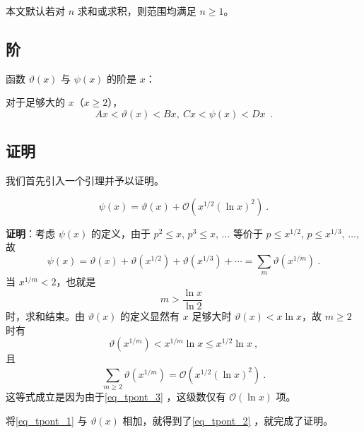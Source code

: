 
本文默认若对 $n$ 求和或求积，则范围均满足 $n \ge 1$。
\subsection{阶}
\begin{theorem}{}
函数 $\vartheta(x)$ 与 $\psi(x)$ 的阶是 $x$：

对于足够大的 $x$（$x \ge 2$），
\begin{equation}
Ax < \vartheta(x) < Bx, ~ Cx < \psi(x) < Dx ~ ~.
\end{equation}

\end{theorem}

\subsection{证明}
我们首先引入一个引理并予以证明。
\begin{lemma}{}
\begin{equation}
\psi(x) = \vartheta(x) + \mathcal O\left( x^{1/2} (\ln x)^{2} \right) ~.
\end{equation}

\end{lemma}
\textbf{证明}：考虑 $\psi(x)$ 的定义，由于 $p^2 \le x$, $p^3 \le x$, $\dots$ 等价于 $p \le x^{1/2}$, $p \le x^{1/3}$, $\dots$, 故
\begin{equation}\label{eq_tpont_2}
\psi(x) = \vartheta(x) + \vartheta(x^{1/2}) + \vartheta(x^{1/3}) + \cdots = \sum_{m} \vartheta(x^{1/m}) ~.
\end{equation}
当 $x^{1/m} < 2$，也就是
\begin{equation}\label{eq_tpont_3}
m > \frac{\ln x}{\ln 2} ~~
\end{equation}
时，求和结束。由 $\vartheta(x)$ 的定义显然有 $x$ 足够大时 $\vartheta(x) < x \ln x$，故 $m \ge 2$ 时有
\begin{equation}
\vartheta(x^{1/m}) < x^{1/m} \ln x \le x^{1/2} \ln x~,
\end{equation}
且
\begin{equation}\label{eq_tpont_1}
\sum_{m \ge 2} \vartheta(x^{1/m}) = \mathcal O\left( x^{1/2} (\ln x)^{2} \right) ~.
\end{equation}
这等式成立是因为由于\autoref{eq_tpont_3} ，这级数仅有 $\mathcal O(\ln x)$ 项。

将\autoref{eq_tpont_1} 与 $\vartheta(x)$ 相加，就得到了\autoref{eq_tpont_2} ，就完成了证明。


